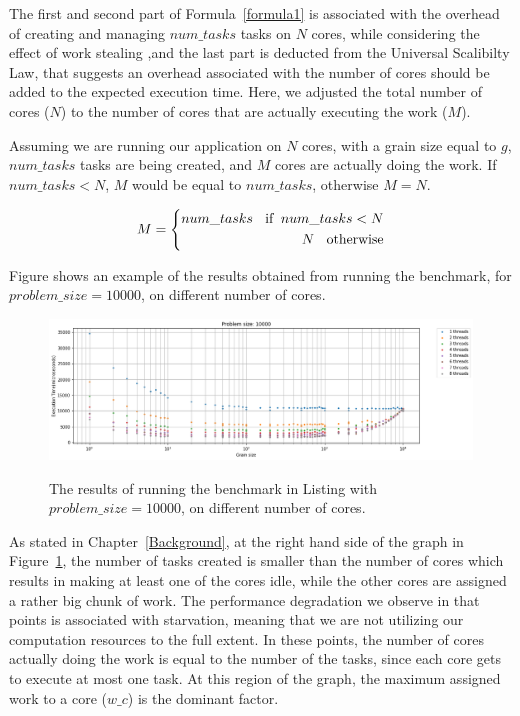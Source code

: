 The first and second part of Formula~\ref{formula1} is associated with the overhead of creating and managing $num\_{tasks}$ tasks on $N$ cores, while considering the effect of work stealing ,and the last part is deducted from the Universal Scalibilty Law\cite{gunther2007guerrilla}, that suggests an overhead associated with the number of cores should be added to the expected execution time. Here, we adjusted the total number of cores ($N$) to the number of cores that are actually executing the work ($M$). 

Assuming we are running our application on $N$ cores, with a grain size equal to $g$, $num\_{tasks}$ tasks are being created, and $M$ cores are actually doing the work. If $num\_{tasks}<N$, $M$ would be equal to $num\_{tasks}$, otherwise $M=N$.

\begin{equation}\label{formula19}
M=\left\{
\begin{aligned}
num\_{tasks} \text{\:\:\:\:if \:} num\_{tasks}<N\\
N \text{\:\:\:\:otherwise}
\end{aligned}
\right.
\end{equation}

Figure shows an example of the results obtained from running the benchmark, for $problem\_size=10000$, on different number of cores.

\vspace{\baselineskip}	
\begin{figure}[H]
	\centering
	{\includegraphics[scale=.45]{images/hpx_for_loop/10000_8_all.png}}
	\caption{The results of running the benchmark in Listing with $problem\_size=10000$, on different number of cores.}\label{fig39}		
\end{figure}

As stated in Chapter~\ref{Background}, at the right hand side of the graph in Figure~\ref{fig39}, the number of tasks created is smaller than the number of cores which results in making at least one of the cores idle, while the other cores are assigned a rather big chunk of work. The performance degradation we observe in that points is associated with starvation, meaning that we are not utilizing our computation resources to the full extent. In these points, the number of cores actually doing the work is equal to the number of the tasks, since each core gets to execute at most one task. At this region of the graph, the maximum assigned work to a core ($w\_c$) is the dominant factor.   

